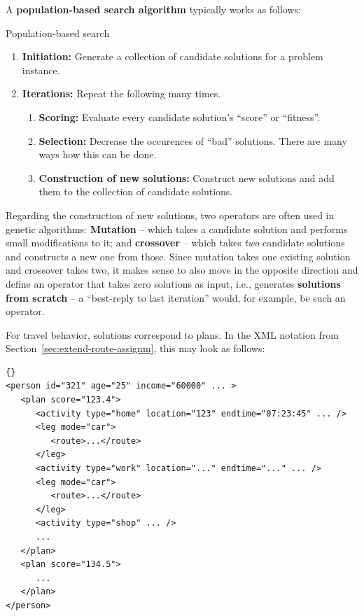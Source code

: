 A \textbf{population-based search algorithm} typically works as
follows:
\begin{algorithm}[H]

\caption{Population-based search}

\begin{enumerate}

\item \textbf{Initiation:} Generate a collection of candidate
  solutions for a problem instance.

\item \textbf{Iterations:} Repeat the following many times.

\begin{enumerate}

\item \textbf{Scoring:} Evaluate every candidate solution's ``score''
  or ``fitness''.

\item \textbf{Selection:} Decrease the occurences of ``bad''
  solutions.  There are many ways how this can be done.

\item \textbf{Construction of new solutions:} Construct new solutions
  and add them to the collection of candidate solutions.

\end{enumerate}

\end{enumerate}

\end{algorithm}

Regarding the construction of new solutions, two operators are often
used in genetic algorithms: \textbf{Mutation} -- which takes a
candidate solution and performs small modifications to it; and
\textbf{crossover} -- which takes \emph{two} candidate solutions and
constructs a new one from those.  Since mutation takes one existing
solution and crossover takes two, it makes sense to also move in the
opposite direction and define an operator that takes zero solutions as
input, i.e., generates \textbf{solutions from scratch} -- a
``best-reply to last iteration'' would, for example, be such an
operator.

For travel behavior, solutions correspond to plans.
In the XML notation from Section~\ref{sec:extend-route-assignm}, 
this may look as follows:
\begin{lstlisting}{}
<person id="321" age="25" income="60000" ... >
   <plan score="123.4">
      <activity type="home" location="123" endtime="07:23:45" ... />
      <leg mode="car">
         <route>...</route>
      </leg>
      <activity type="work" location="..." endtime="..." ... />
      <leg mode="car">
         <route>...</route>
      </leg>
      <activity type="shop" ... />
      ...
   </plan>
   <plan score="134.5">
      ...
   </plan>
</person>
\end{lstlisting}

